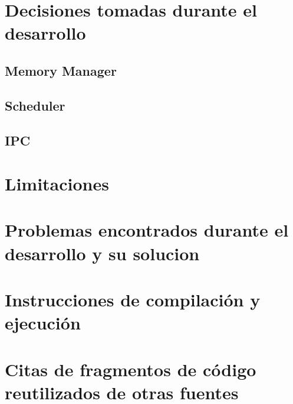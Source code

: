 \documentclass[12pt]{article}
\begin{document}
\section{Decisiones tomadas durante el desarrollo}

\subsection{Memory Manager}
\subsection{Scheduler}
\subsection{IPC}

\section{Limitaciones}

\section{Problemas encontrados durante el desarrollo y su solucion}
\section{Instrucciones de compilaci\'on y ejecuci\'on}
\section{Citas de fragmentos de código reutilizados de otras fuentes} 
\end{document}
